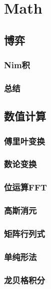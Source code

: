 \section{Math}

\subsection{博弈}
\subsubsection{Nim积}

\subsubsection{总结}


\subsection{数值计算}
\subsubsection{傅里叶变换}

\subsubsection{数论变换}

\subsubsection{位运算FFT}

\subsubsection{高斯消元}

\subsubsection{矩阵行列式}

\subsubsection{单纯形法}

\subsubsection{龙贝格积分}


